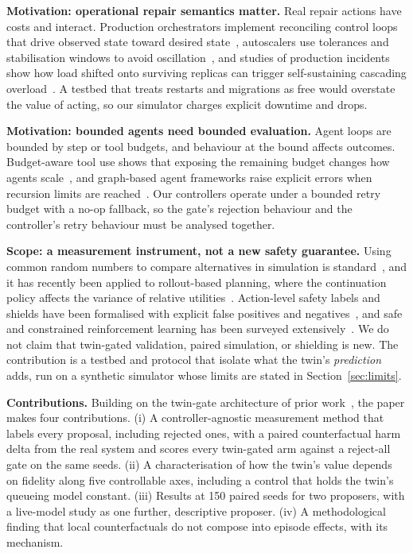 \documentclass[conference]{IEEEtran}
\begin{document}
\textbf{Motivation: operational repair semantics matter.} Real repair actions have costs and interact. Production orchestrators implement reconciling control loops that drive observed state toward desired state~\cite{k8scontroller}, autoscalers use tolerances and stabilisation windows to avoid oscillation~\cite{k8shpa}, and studies of production incidents show how load shifted onto surviving replicas can trigger self-sustaining cascading overload~\cite{metastable}. A testbed that treats restarts and migrations as free would overstate the value of acting, so our simulator charges explicit downtime and drops.

\textbf{Motivation: bounded agents need bounded evaluation.} Agent loops are bounded by step or tool budgets, and behaviour at the bound affects outcomes. Budget-aware tool use shows that exposing the remaining budget changes how agents scale~\cite{budgetaware}, and graph-based agent frameworks raise explicit errors when recursion limits are reached~\cite{langgraph}. Our controllers operate under a bounded retry budget with a no-op fallback, so the gate's rejection behaviour and the controller's retry behaviour must be analysed together.

\textbf{Scope: a measurement instrument, not a new safety guarantee.} Using common random numbers to compare alternatives in simulation is standard~\cite{stochsim}, and it has recently been applied to rollout-based planning, where the continuation policy affects the variance of relative utilities~\cite{yadav}. Action-level safety labels and shields have been formalised with explicit false positives and negatives~\cite{rulebasedshield}, and safe and constrained reinforcement learning has been surveyed extensively~\cite{saferlsurvey}. We do not claim that twin-gated validation, paired simulation, or shielding is new. The contribution is a testbed and protocol that isolate what the twin's \emph{prediction} adds, run on a synthetic simulator whose limits are stated in Section~\ref{sec:limits}.

\textbf{Contributions.} Building on the twin-gate architecture of prior work~\cite{aether,processplant,twingatedorch}, the paper makes four contributions. (i) A controller-agnostic measurement method that labels every proposal, including rejected ones, with a paired counterfactual harm delta from the real system and scores every twin-gated arm against a reject-all gate on the same seeds. (ii) A characterisation of how the twin's value depends on fidelity along five controllable axes, including a control that holds the twin's queueing model constant. (iii) Results at 150 paired seeds for two proposers, with a live-model study as one further, descriptive proposer. (iv) A methodological finding that local counterfactuals do not compose into episode effects, with its mechanism.
\end{document}
